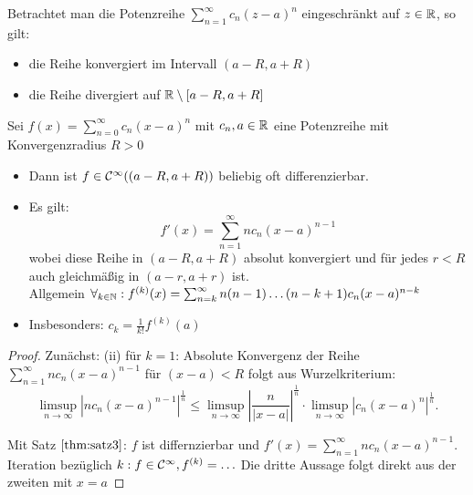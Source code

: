 \begin{remark}
Betrachtet man die Potenzreihe $\sum_{n=1}^{\infty} c_n(z-a)^{n}$ eingeschränkt auf $z \in \mathbb{R}$, so gilt:
\begin{itemize}
    \item die Reihe konvergiert im Intervall $(a-R,a+R)$ 
    \item die Reihe divergiert auf $\mathbb{R} \setminus [a-R,a+R]$     
\end{itemize}
\end{remark}
\begin{theorem}
Sei $f(x)=\sum_{n=0}^{\infty} c_n(x-a)^n$ mit $c_n,a \in \mathbb{R}$ eine Potenzreihe mit Konvergenzradius $R>0$
\begin{itemize}
    \item Dann ist $f \in \mathcal{C}^{\infty}((a-R,a+R))$ beliebig oft differenzierbar. 
    \item Es gilt: \[
    f'(x) = \sum_{n=1}^{\infty} nc_n(x-a)^{n-1}
    \]
    wobei diese Reihe in $(a-R,a+R)$ absolut konvergiert und für jedes $r<R$ auch gleichmäßig in $(a-r,a+r)$ ist. \\ 
    Allgemein $\forall_{k \in  \mathbb{N}}: f^{(k)}(x) = \sum_{n=k}^{\infty} n(n-1)\ldots(n-k+1)c_n(x-a)^{n-k}$
\item Insbesonders: $c_k = \frac{1}{k!}f^{(k)}(a)$ 
\end{itemize}
\end{theorem}
\begin{proof}
Zunächst: (ii) für $k=1$: Absolute Konvergenz der Reihe $\sum_{n=1}^{\infty} nc_n(x-a)^{n-1}$ für $(x-a) < R$ folgt aus Wurzelkriterium:
\[
\limsup_{n \to \infty} |nc_n(x-a)^{n-1}|^{\frac{1}{n}} \le \limsup_{n \to \infty} \left| \frac{n}{|x-a|} \right|^{\frac{1}{n}}\cdot \limsup_{n \to \infty} |c_n(x-a)^{n}|^{\frac{1}{n}}
.\]%

Mit  Satz $\ref{thm:satz3}$: $f$ ist differnzierbar und $f'(x)= \sum_{n=1}^{\infty} nc_n(x-a)^{n-1}$. Iteration bezüglich $k: f \in \mathcal{C}^{\infty}, f^{(k)}= \ldots$ 
Die dritte Aussage folgt direkt aus der zweiten mit $x=a$ 
\end{proof}

